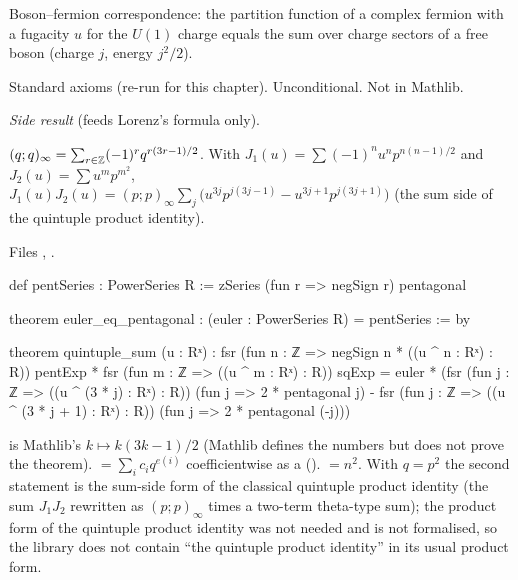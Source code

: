 \begin{physics}
Boson--fermion correspondence: the partition function of a complex fermion with a fugacity $u$ for the $U(1)$ charge
equals the sum over charge sectors of a free boson (charge $j$, energy $j^2/2$).
\end{physics}
\begin{status}
Standard axioms (re-run for this chapter). Unconditional. Not in Mathlib.
\end{status}

\noindent\emph{Side result} (feeds Lorenz's formula only).
\begin{theorem}\label{l25:thm:pent}
$(q;q)_\infty=\sum_{r\in{\mathbb{Z}}}(-1)^rq^{r(3r-1)/2}$. With $J_1(u)=\sum(-1)^nu^np^{n(n-1)/2}$ and $J_2(u)=\sum u^mp^{m^2}$,
$J_1(u)J_2(u)=(p;p)_\infty\sum_j\big(u^{3j}p^{j(3j-1)}-u^{3j+1}p^{j(3j+1)}\big)$ (the sum side of the quintuple
product identity).
\end{theorem}
\noindent Files ,
.
\begin{leancode}
def pentSeries : PowerSeries R := zSeries (fun r => negSign r) pentagonal

theorem euler_eq_pentagonal : (euler : PowerSeries R) = pentSeries := by

theorem quintuple_sum (u : Rˣ) :
    fsr (fun n : ℤ => negSign n * ((u ^ n : Rˣ) : R)) pentExp *
        fsr (fun m : ℤ => ((u ^ m : Rˣ) : R)) sqExp =
      euler * (fsr (fun j : ℤ => ((u ^ (3 * j) : Rˣ) : R)) (fun j => 2 * pentagonal j) -
        fsr (fun j : ℤ => ((u ^ (3 * j + 1) : Rˣ) : R)) (fun j => 2 * pentagonal (-j)))
\end{leancode}
\begin{dictionary}
 is Mathlib's $k\mapsto k(3k-1)/2$ (Mathlib defines the numbers but does not prove the theorem).
 $=\sum_ic_iq^{e(i)}$ coefficientwise as a  ().
 $=n^2$. With $q=p^2$ the second statement is the sum-side form of the classical quintuple product identity
(the sum $J_1J_2$ rewritten as $(p;p)_\infty$ times a two-term theta-type sum); the product form of the quintuple
product identity was not needed and is not formalised, so the library does not contain ``the quintuple product
identity'' in its usual product form.
\end{dictionary}
